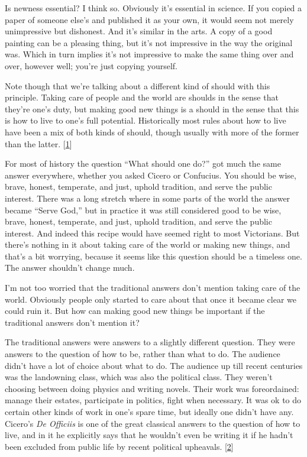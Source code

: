 Is newness essential? I think so. Obviously it's essential in science.
If you copied a paper of someone else's and published it as your own, it
would seem not merely unimpressive but dishonest. And it's similar in
the arts. A copy of a good painting can be a pleasing thing, but it's
not impressive in the way the original was. Which in turn implies it's
not impressive to make the same thing over and over, however well;
you're just copying yourself.

Note though that we're talking about a different kind of should with
this principle. Taking care of people and the world are shoulds in the
sense that they're one's duty, but making good new things is a should in
the sense that this is how to live to one's full potential. Historically
most rules about how to live have been a mix of both kinds of should,
though usually with more of the former than the latter.
{[}\hyperref[f1n]{1}{]}

For most of history the question ``What should one do?'' got much the
same answer everywhere, whether you asked Cicero or Confucius. You
should be wise, brave, honest, temperate, and just, uphold tradition,
and serve the public interest. There was a long stretch where in some
parts of the world the answer became ``Serve God,'' but in practice it
was still considered good to be wise, brave, honest, temperate, and
just, uphold tradition, and serve the public interest. And indeed this
recipe would have seemed right to most Victorians. But there's nothing
in it about taking care of the world or making new things, and that's a
bit worrying, because it seems like this question should be a timeless
one. The answer shouldn't change much.

I'm not too worried that the traditional answers don't mention taking
care of the world. Obviously people only started to care about that once
it became clear we could ruin it. But how can making good new things be
important if the traditional answers don't mention it?

The traditional answers were answers to a slightly different question.
They were answers to the question of how to be, rather than what to do.
The audience didn't have a lot of choice about what to do. The audience
up till recent centuries was the landowning class, which was also the
political class. They weren't choosing between doing physics and writing
novels. Their work was foreordained: manage their estates, participate
in politics, fight when necessary. It was ok to do certain other kinds
of work in one's spare time, but ideally one didn't have any. Cicero's
\emph{De Officiis} is one of the great classical answers to the question
of how to live, and in it he explicitly says that he wouldn't even be
writing it if he hadn't been excluded from public life by recent
political upheavals. {[}\hyperref[f2n]{2}{]}

